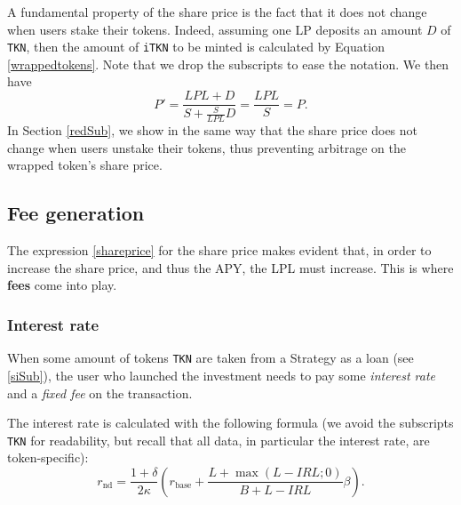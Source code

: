 \documentclass[a4paper,10 pt]{article}
\theoremstyle{definition}
\begin{document}
A fundamental property of the share price is the fact that it does not change when users stake their tokens. Indeed, assuming one LP deposits an amount $D$ of \verb|TKN|, then the amount of \verb|iTKN| to be minted is calculated by Equation \eqref{wrappedtokens}. Note that we drop the subscripts to ease the notation. We then have
$$P' = \frac{LPL + D}{S + \frac{S}{LPL}D} = \frac{LPL}{S} = P.$$
In Section \ref{redSub}, we show in the same way that the share price does not change when users unstake their tokens, thus preventing arbitrage on the wrapped token's share price.

\subsection{Fee generation}\label{fgSub}
The expression \eqref{shareprice} for the share price makes evident that, in order to increase the share price, and thus the APY, the LPL must increase. This is where {\bf fees} come into play.

\subsubsection{Interest rate}\label{irSubSub}
When some amount of tokens \verb|TKN| are taken from a Strategy as a loan (see \ref{siSub}), the user who launched the investment needs to pay some {\it interest rate} and a {\it fixed fee} on the transaction. 

The interest rate is calculated with the following formula (we avoid the subscripts \verb|TKN| for readability, but recall that all data, in particular the interest rate, are token-specific):
\begin{equation}\label{interestRate}
r_{\text{nd}} = \frac{1+\delta}{2\kappa}\left(r_{\text{base}} + \frac{L + \max(L-IRL;0)}{B+L-IRL}\beta\right).
\end{equation}
\end{document}
